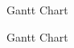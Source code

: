 \documentclass[11pt]{article}
\begin{document}
	\newpage
	\begin{figure}[h!]
		
		
		\caption{	Gantt Chart}
		\label{MRes Gantt}
		
	\end{figure} 
	
	\newpage
	
	\begin{figure}[h!]
	
	
	\caption{	Gantt Chart}
	\label{MRes Gantt}
	
	\end{figure} 

	\newpage
	\begin{thebibliography}{1}
	
	\end{thebibliography}
	
\end{document}
